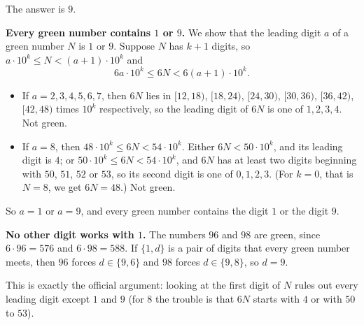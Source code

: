 The answer is $\boxed{9}$.

\textbf{Every green number contains $1$ or $9$.} We show that the leading digit $a$ of a green number $N$ is $1$ or $9$. Suppose $N$ has $k+1$ digits, so $a\cdot10^k\le N<(a+1)\cdot10^k$ and
\[
6a\cdot10^k\le 6N<6(a+1)\cdot10^k .
\]
\begin{itemize}
\item If $a=2,3,4,5,6,7$, then $6N$ lies in $[12,18)$, $[18,24)$, $[24,30)$, $[30,36)$, $[36,42)$, $[42,48)$ times $10^k$ respectively, so the leading digit of $6N$ is one of $1,2,3,4$. Not green.
\item If $a=8$, then $48\cdot10^k\le6N<54\cdot10^k$. Either $6N<50\cdot10^k$, and its leading digit is $4$; or $50\cdot10^k\le 6N<54\cdot10^k$, and $6N$ has at least two digits beginning with $50$, $51$, $52$ or $53$, so its second digit is one of $0,1,2,3$. (For $k=0$, that is $N=8$, we get $6N=48$.) Not green.
\end{itemize}
So $a=1$ or $a=9$, and every green number contains the digit $1$ or the digit $9$.

\textbf{No other digit works with $1$.} The numbers $96$ and $98$ are green, since $6\cdot96=576$ and $6\cdot98=588$. If $\{1,d\}$ is a pair of digits that every green number meets, then $96$ forces $d\in\{9,6\}$ and $98$ forces $d\in\{9,8\}$, so $d=9$.

This is exactly the official argument: looking at the first digit of $N$ rules out every leading digit except $1$ and $9$ (for $8$ the trouble is that $6N$ starts with $4$ or with $50$ to $53$).
